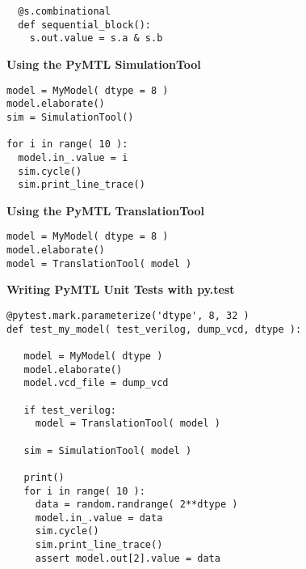 \documentclass{cbxdoc}
\begin{document}
\begin{landscape}
\begin{minipage}[t]{3.25in}
\begin{cbxlist}{1.5em}{0em}{1em}
\begin{verbatim}
  @s.combinational
  def sequential_block():
    s.out.value = s.a & s.b
\end{verbatim}

\end{cbxlist}

\end{minipage}%
\hfill%
\begin{minipage}[t]{3.25in}
\vspace{0pt}

\colorbox{gray!30!white}{\parbox{1.025\tw}{\rule[-0.4em]{0pt}{1.4em}\centering\textbf{%
  Using the PyMTL SimulationTool%
}}}

\smallskip
\begin{lstlisting}[numbers={none},xleftmargin={0.1in}]
model = MyModel( dtype = 8 )
model.elaborate()
sim = SimulationTool()

for i in range( 10 ):
  model.in_.value = i
  sim.cycle()
  sim.print_line_trace()
\end{lstlisting}

\vspace{0.15in}
\colorbox{gray!30!white}{\parbox{1.025\tw}{\rule[-0.4em]{0pt}{1.4em}\centering\textbf{%
  Using the PyMTL TranslationTool%
}}}

\smallskip
\begin{lstlisting}[numbers={none},xleftmargin={0.1in}]
model = MyModel( dtype = 8 )
model.elaborate()
model = TranslationTool( model )
\end{lstlisting}

\vspace{0.15in}
\colorbox{gray!30!white}{\parbox{1.025\tw}{\rule[-0.4em]{0pt}{1.4em}\centering\textbf{%
  Writing PyMTL Unit Tests with py.test%
}}}

\smallskip
\begin{lstlisting}[numbers={none},xleftmargin={0.1in}]
@pytest.mark.parameterize('dtype', 8, 32 )
def test_my_model( test_verilog, dump_vcd, dtype ):

   model = MyModel( dtype )
   model.elaborate()
   model.vcd_file = dump_vcd

   if test_verilog:
     model = TranslationTool( model )

   sim = SimulationTool( model )

   print()
   for i in range( 10 ):
     data = random.randrange( 2**dtype )
     model.in_.value = data
     sim.cycle()
     sim.print_line_trace()
     assert model.out[2].value = data
\end{lstlisting}


\end{minipage}
\end{landscape}
\end{document}
